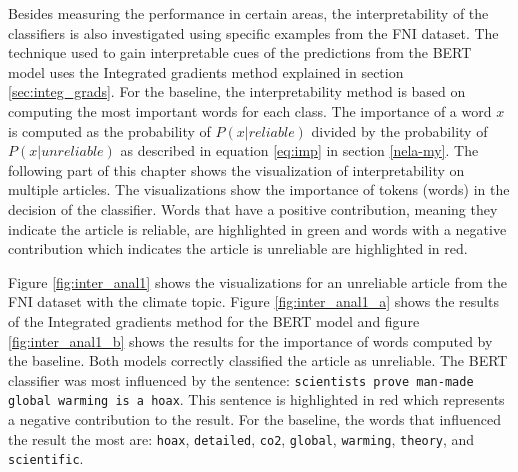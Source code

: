 Besides measuring the performance in certain areas, the interpretability of the classifiers is also investigated using specific examples from the FNI dataset. The technique used to gain interpretable cues of the predictions from the BERT model uses the Integrated gradients method explained in section \ref{sec:integ_grads}. For the baseline, the interpretability method is based on computing the most important words for each class. The importance of a word $x$ is computed as the probability of $P(x|reliable)$ divided by the probability of $P(x|unreliable)$ as described in equation \ref{eq:imp} in section \ref{nela-my}.
The following part of this chapter shows the visualization of interpretability on multiple articles. The visualizations show the importance of tokens (words) in the decision of the classifier. Words that have a positive contribution, meaning they indicate the article is reliable, are highlighted in green and words with a negative contribution which indicates the article is unreliable are highlighted in red.

Figure \ref{fig:inter_anal1} shows the visualizations for an unreliable article from the FNI dataset with the climate topic. Figure \ref{fig:inter_anal1_a} shows the results of the Integrated gradients method for the BERT model and figure \ref{fig:inter_anal1_b} shows the results for the importance of words computed by the baseline. Both models correctly classified the article as unreliable. The BERT classifier was most influenced by the sentence: \texttt{scientists prove man-made global warming is a hoax}. This sentence is highlighted in red which represents a negative contribution to the result. For the baseline, the words that influenced the result the most are: \texttt{hoax}, \texttt{detailed}, \texttt{co2}, \texttt{global}, \texttt{warming}, \texttt{theory}, and \texttt{scientific}.

